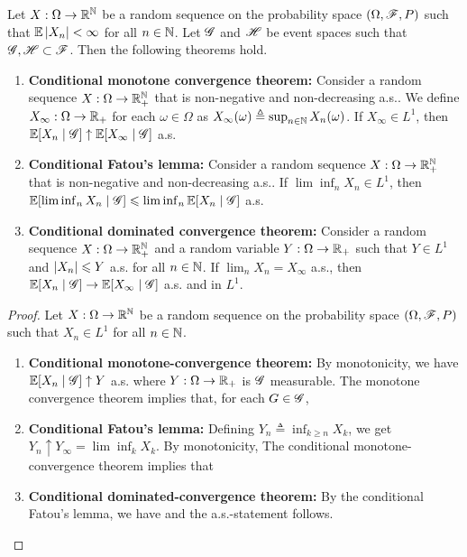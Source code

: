 \documentclass[letterpaper,10pt,english]{article}
\begin{document}
\begin{prop} 
Let $X:\Omega\to\mathbb{R}^{\mathbb{N}}$ be a random sequence on the probability space $(\Omega, \mathscr{F}, P)$ such that $\mathbb{E}\left\lvert X_n\right\rvert < \infty$ for all $n \in \mathbb{N}$.  
Let $\mathscr{G}$ and $\mathscr{H}$ be event spaces such that $\mathscr{G}, \mathscr{H} \subset \mathscr{F}$. 
Then the following theorems hold.
\begin{enumerate}
\item \textbf{Conditional monotone convergence theorem:} 
Consider a random sequence $X:\Omega\to\mathbb{R}_+^{\mathbb{N}}$ that is non-negative and non-decreasing a.s..
We define $X_\infty:\Omega\to\mathbb{R}_+$ for each $\omega \in \Omega$ as $X_\infty(\omega)\triangleq \sup_{n \in \mathbb{N}}X_n(\omega)$.  
If $X_\infty \in L^1$, then $\mathbb{E}[X_n\mid \mathscr{G}] \uparrow \mathbb{E}[X_\infty\mid\mathscr{G}]$ a.s. 

\item \textbf{Conditional Fatou's lemma:} 
Consider a random sequence $X:\Omega\to\mathbb{R}_+^{\mathbb{N}}$ that is non-negative and non-decreasing a.s.. 
If $\lim\inf_n X_n \in L^1$, then $\mathbb{E}[\lim\inf_nX_n\mid \mathscr{G}] \leqslant \lim\inf_n\mathbb{E}[X_n\mid \mathscr{G}]$ a.s. 

\item \textbf{Conditional dominated convergence theorem:} 
Consider a random sequence $X:\Omega\to\mathbb{R}_+^{\mathbb{N}}$ and a random variable $Y:\Omega\to\mathbb{R}_+$ such that $Y \in L^1$ and $\left\lvert X_n\right\rvert \leqslant Y$ a.s. for all $n \in  \mathbb{N}$. 
If $\lim_n X_n = X_\infty$ a.s., then $\mathbb{E}[X_n\mid \mathscr{G}] \to  \mathbb{E}[X_\infty\mid\mathscr{G}]$ a.s. and in $L^1$.
\end{enumerate}
\end{prop}
\begin{proof}
Let $X:\Omega\to\mathbb{R}^{\mathbb{N}}$ be a random sequence on the probability space $(\Omega, \mathscr{F}, P)$ such that $X_n \in L^1$ for all $n \in \mathbb{N}$.  
\begin{enumerate}
\item \textbf{Conditional monotone-convergence theorem:} 
By monotonicity, we have $\mathbb{E}[X_n\mid \mathscr{G}] \uparrow Y$ a.s. where $Y:\Omega\to \mathbb{R}_+$ is $\mathscr{G}$ measurable. 
The monotone convergence theorem implies that, for each $G \in  \mathscr{G}$,

\item \textbf{Conditional Fatou's lemma:} 
Defining $Y_n \triangleq \inf_{k\ge n} X_k$, we get $Y_n \uparrow Y_\infty = \lim\inf_k X_k$. 
By monotonicity,
The conditional monotone-convergence theorem implies that
\item \textbf{Conditional dominated-convergence theorem:}
By the conditional Fatou's lemma, we have
and the a.s.-statement follows.
\end{enumerate}
\end{proof}
\end{document}
